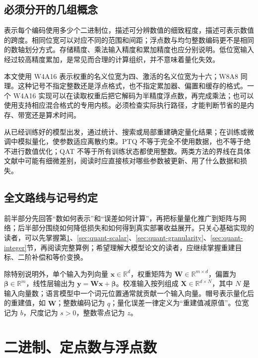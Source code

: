 \documentclass[UTF8,12pt,a4paper,fontset=fandol]{ctexart}
\begin{document}
\subsection{必须分开的几组概念}
表示每个编码使用多少个二进制位，描述可分辨数值的细致程度，描述可表示数值的跨度。相同位宽可以对应不同的范围和间距；浮点数与均匀整数编码更不是相同的数轴划分方式。存储精度、乘法输入精度和累加精度也应分别说明。低位宽输入经过较高精度累加，是常见而合理的计算组织，并不意味着量化失效。

本文使用 W4A16 表示权重的名义位宽为四、激活的名义位宽为十六；W8A8 同理。这种记号不指定整数还是浮点格式，也不指定累加器、偏置和缓存的格式。一个 W4A16 实现可以在读取权重后把它解码为半精度浮点数，再完成乘法；也可以使用支持相应混合格式的专用内核。必须检查实际执行路径，才能判断节省的是内存、带宽还是算术时间。

从已经训练好的模型出发，通过统计、搜索或局部重建确定量化结果；在训练或微调中模拟量化，使参数适应离散约束。PTQ 不等于完全不使用数据，也不等于绝不进行数值优化；QAT 不等于所有训练状态都使用整数。两类方法的界线在具体文献中可能有细微差别，阅读时应直接核对哪些参数被更新、用了什么数据和损失。

\subsection{全文路线与记号约定}
前半部分先回答“数如何表示”和“误差如何计算”，再把标量量化推广到矩阵与网络；后半部分围绕如何降低损失和如何得到真实部署收益展开。只关心基础实现的读者，可以先掌握第\ref{sec:quant-number}、\ref{sec:quant-scalar}、\ref{sec:quant-granularity}、\ref{sec:quant-integer}节，再阅读完整算例；希望理解大模型论文的读者，应继续掌握重建目标、二阶补偿和等价变换。

除特别说明外，单个输入为列向量 $\mathbf x\in\mathbb R^d$，权重矩阵为 $\mathbf W\in\mathbb R^{m\times d}$，偏置为 $\boldsymbol\beta\in\mathbb R^m$，线性层输出为 $\mathbf y=\mathbf W\mathbf x+\boldsymbol\beta$。校准输入按列组成 $\mathbf X\in\mathbb R^{d\times N}$，其中 $N$ 是输入向量数；语言模型中一个词元位置通常就贡献一个输入向量。帽号表示量化后的重建值，如 $\widehat{\mathbf W}$；整数编码记为 $q$；量化误差一律定义为“重建值减原值”。位宽记为 $b$，尺度记为 $s>0$，整数零点记为 $z$。

\section{二进制、定点数与浮点数}
\label{sec:quant-number}
\end{document}
